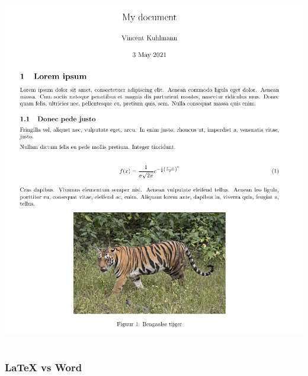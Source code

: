 \documentclass[presentatie.tex]{subfiles}
\def\named#1{}
\begin{document}
\begin{frame}
\begin{columns}
\begin{column}{0.5\textwidth}
                \includegraphics[width=\linewidth,height=0.8\textheight,keepaspectratio]{assets/basicDocLaTeXSnippet.png}
            \end{column}
        \end{columns}
    \end{frame}

    \named{intro-wordcomp-doc-eqfragment}
    \begin{frame}
        \frametitle{\LaTeX{} vs Word}

        \bgroup
        \setlength{\fboxsep}{0pt}
        \medskip

        \egroup
    \end{frame}
\end{document}
